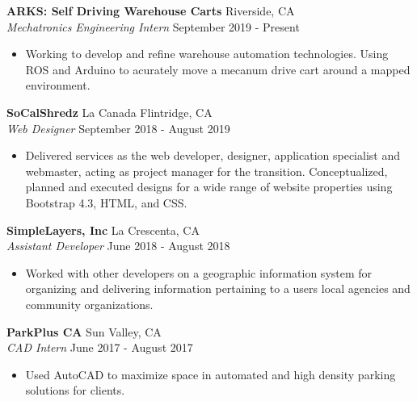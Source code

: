 \documentclass[a4paper]{article}
\begin{document}
\textbf{ARKS: Self Driving Warehouse Carts} \hfill Riverside, CA\\
\textit{Mechatronics Engineering Intern} \hfill September 2019 - Present\\
\vspace{-1mm}
\begin{itemize} \itemsep 1pt
	\item Working to develop and refine warehouse automation technologies. Using ROS and Arduino to acurately move a mecanum drive cart around a mapped environment.
\end{itemize}
\textbf{SoCalShredz} \hfill La Canada Flintridge, CA\\
\textit{Web Designer} \hfill September 2018 - August 2019\\
\vspace{-1mm}
\begin{itemize} \itemsep 1pt
	\item Delivered services as the web developer, designer, application specialist and webmaster, acting as project manager for the transition. Conceptualized, planned and executed designs for a wide range of website properties using Bootstrap 4.3, HTML, and CSS.
\end{itemize}
\textbf{SimpleLayers, Inc} \hfill La Crescenta, CA\\
\textit{Assistant Developer} \hfill June 2018 - August 2018\\
\vspace{-1mm}
\begin{itemize} \itemsep 1pt
	\item Worked with other developers on a geographic information system for organizing and delivering information pertaining to a user\textquotesingle{}s local agencies and community organizations.
\end{itemize}
\textbf{ParkPlus CA} \hfill Sun Valley, CA\\
\textit{CAD Intern} \hfill June 2017 - August 2017\\
\vspace{-1mm}
\begin{itemize} \itemsep 1pt
	\item Used AutoCAD to maximize space in automated and high density parking solutions for clients.
\end{itemize}
\end{document}
